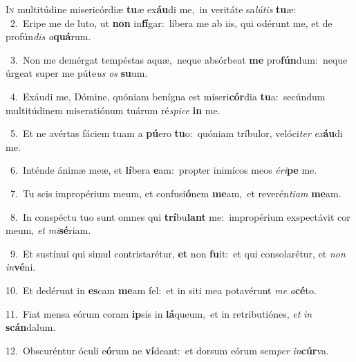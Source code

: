 \lettrine{\initial\textcolor{\initialcolor}{I}}{n} multitúdine misericórdiæ \textbf{tu}\-æ ex\-\textbf{áu}\-di me,~\star in veritáte sa\-\textit{lú}\-\textit{tis} \textbf{tu}\-æ:\\
{\numbfont\textcolor{\numbcolor}{~2.}}~Eripe me de luto, ut \textbf{non} in\-\textbf{fí}\-gar:~\star líbera me ab iis, qui odérunt me, et de profún\textit{dis} \textit{a}\-\textbf{quá}rum.\par
{\numbfont\textcolor{\numbcolor}{~3.}}~Non me demérgat tempéstas aquæ,~\dagger neque absórbeat \textbf{me} pro\-\textbf{fún}\-dum:~\star neque úrgeat super me púte\textit{us} \textit{os} \textbf{su}\-um.\par
{\numbfont\textcolor{\numbcolor}{~4.}}~Exáudi me, Dómine, quóniam benígna est miseri\-\textbf{cór}\-dia \textbf{tu}\-a:~\star secúndum multitúdinem miseratiónum tuárum ré\-\textit{spi}\-\textit{ce} \textbf{in} me.\par
{\numbfont\textcolor{\numbcolor}{~5.}}~Et ne avértas fáciem tuam a \textbf{pú}\-ero \textbf{tu}\-o:~\star quóniam tríbulor, velóci\textit{ter} \textit{ex}\-\textbf{áu}di me.\par
{\numbfont\textcolor{\numbcolor}{~6.}}~Inténde ánimæ meæ, et \textbf{lí}\-bera \textbf{e}\-am:~\star propter inimícos meos \textit{é}\-\textit{ri}\textbf{pe} me.\par
{\numbfont\textcolor{\numbcolor}{~7.}}~Tu scis impropérium meum, et confusi\-\textbf{ó}\-nem \textbf{me}\-am,~\star et reverén\-\textit{ti}\-\textit{am} \textbf{me}\-am.\par
{\numbfont\textcolor{\numbcolor}{~8.}}~In conspéctu tuo sunt omnes qui \textbf{trí}\-bu\textbf{lant} me:~\star impropérium exspectávit cor meum, \textit{et} \textit{mi}\-\textbf{sé}riam.\par
{\numbfont\textcolor{\numbcolor}{~9.}}~Et sustínui qui simul contristarétur, \textbf{et} non \textbf{fu}\-it:~\star et qui consolarétur, et \textit{non} \textit{in}\-\textbf{vé}ni.\par
{\numbfont\textcolor{\numbcolor}{10.}}~Et dedérunt in \textbf{es}\-cam \textbf{me}\-am fel:~\star et in siti mea potavérunt \textit{me} \textit{a}\-\textbf{cé}to.\par
{\numbfont\textcolor{\numbcolor}{11.}}~Fiat mensa eórum coram \textbf{ip}\-sis in \textbf{lá}\-queum,~\star et in retributiónes, \textit{et} \textit{in} \textbf{scán}\-dalum.\par
{\numbfont\textcolor{\numbcolor}{12.}}~Obscuréntur óculi e\-\textbf{ó}\-rum ne \textbf{ví}\-deant:~\star et dorsum eórum sem\textit{per} \textit{in}\-\textbf{cúr}va.\par
